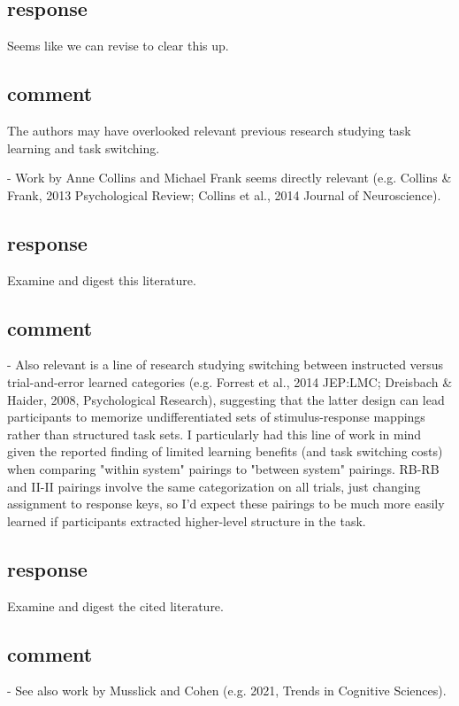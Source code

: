 \subsection{response}
Seems like we can revise to clear this up.

\subsection{comment}
The authors may have overlooked relevant previous research
studying task learning and task switching.

- Work by Anne Collins and Michael Frank seems directly
relevant (e.g. Collins & Frank, 2013 Psychological Review;
Collins et al., 2014 Journal of Neuroscience).

\subsection{response}
Examine and digest this literature.

\subsection{comment}
- Also relevant is a line of research studying switching
between instructed versus trial-and-error learned categories
(e.g. Forrest et al., 2014 JEP:LMC; Dreisbach & Haider,
2008, Psychological Research), suggesting that the latter
design can lead participants to memorize undifferentiated
sets of stimulus-response mappings rather than structured
task sets. I particularly had this line of work in mind
given the reported finding of limited learning benefits (and
task switching costs) when comparing "within system"
pairings to "between system" pairings. RB-RB and II-II
pairings involve the same categorization on all trials, just
changing assignment to response keys, so I'd expect these
pairings to be much more easily learned if participants
extracted higher-level structure in the task.

\subsection{response}
Examine and digest the cited literature.

\subsection{comment}
- See also work by Musslick and Cohen (e.g. 2021, Trends in
Cognitive Sciences).

